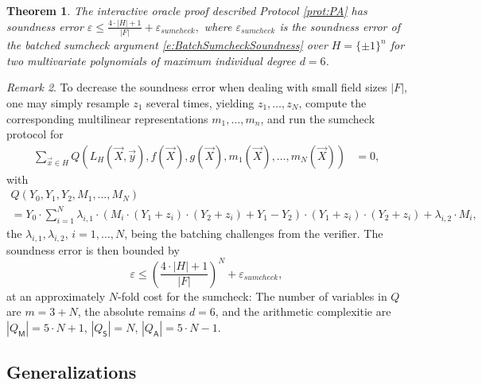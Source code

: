 \documentclass[11pt]{article}
\newtheorem{thm}{Theorem}[]
\theoremstyle{definition}
\theoremstyle{remark}
\newtheorem{rem}[thm]{Remark}
\begin{document}
\begin{thm}
\label{thm:PAsoundness}
 The interactive oracle proof described Protocol \ref{prot:PA} has soundness error
$
\varepsilon \leq \frac{4\cdot |H| + 1}{|F|} + \varepsilon_{sumcheck},
$
where $\varepsilon_{sumcheck}$ is the soundness error of the batched sumcheck argument \eqref{e:BatchSumcheckSoundness} over $H=\{\pm 1\}^n$ for two multivariate polynomials of maximum individual degree $d=6$.
\end{thm}
\begin{rem}
To decrease the soundness error when dealing with small field sizes $|F|$, one may simply resample $z_1$ several times, yielding $z_{1}, \ldots, z_N$, compute the corresponding multilinear representations $m_1, \ldots, m_n$,  and run the sumcheck protocol for
\begin{align} 
\label{e:sumcheckm}
	\sum_{\vec x \in H} Q(L_H(\vec X, \vec y), f(\vec X),  g(\vec X), m_1(\vec X),  \ldots,  m_N(\vec X))&= 0,
\end{align}
with
\begin{multline*}
Q(Y_0 , Y_1, Y_{2}, M_1, \ldots, M_N) 
\\=   
Y_0 \cdot\sum_{i=1}^N \lambda_{i,1}\cdot   \left(M_i\cdot (Y_1 + z_i)\cdot (Y_2+z_i) + Y_1 -  Y_2 \right)\cdot  (Y_1+z_i) \cdot (Y_2 + z_i) +  \lambda_{i,2} \cdot M_i,
\end{multline*}
the $\lambda_{i,1}, \lambda_{i,2}$, $i=1,\ldots, N$, being the batching challenges from the verifier.
The soundness error is then bounded by 
\[
\varepsilon \leq \left(\frac{4\cdot |H| + 1}{|F|}\right)^N + \varepsilon_{sumcheck},
\]
at an approximately  $N$-fold cost for the sumcheck:
The number of variables in $Q$ are  $m= 3 + N$, the absolute remains $d=6$, and the arithmetic complexitie are 
$|Q_\mathsf M|= 5\cdot N + 1$, $|Q_\mathsf S| = N$,  $|Q_\mathsf A|= 5 \cdot N - 1$.
\end{rem}

\subsection{Generalizations}
\end{document}
